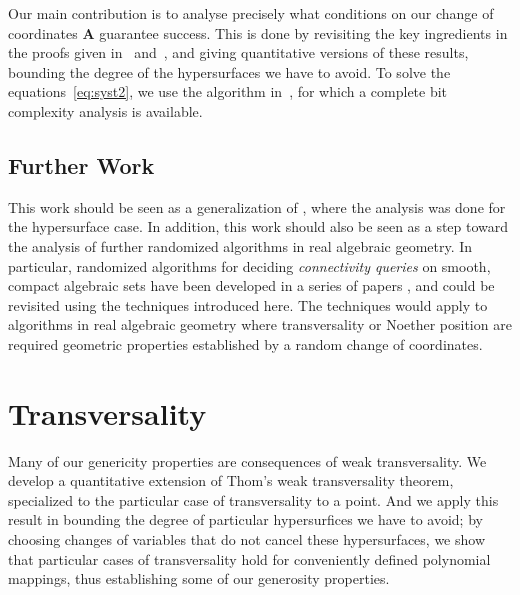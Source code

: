 \documentclass[a4paper]{article}
\def\mA{{\bm A}}
\begin{document}
Our main contribution is to analyse precisely what conditions on our
change of coordinates $\mA$ guarantee success. This is done by
revisiting the key ingredients in the proofs given
in~\cite{BaGiHeMb97} and~\cite{EMP}, and giving quantitative versions
of these results, bounding the degree of the hypersurfaces we have to
avoid.  To solve the equations~\eqref{eq:syst2}, we use the algorithm
in~\cite{SH}, for which a complete bit complexity analysis is
available.


\subsection{Further Work}
This work should be seen as a generalization of \cite{ElGiSh20}, where the analysis was done for the hypersurface case. In addition, this work should also be seen as a step toward the analysis of
further randomized algorithms in real algebraic geometry.  In particular, randomized algorithms for deciding {\em
  connectivity queries} on smooth, compact algebraic sets have been
developed in a series of papers
\cite{SchostMohabBabySteps2011,SchostMohabBabySteps2014}, and could be
revisited using the techniques introduced here. The techniques would apply to algorithms in real algebraic geometry where transversality or Noether position are required geometric properties established by a random change of coordinates.



\section{Transversality}
Many of our genericity properties are consequences of weak transversality. We develop a quantitative extension of Thom’s weak transversality theorem, specialized to the particular case of transversality to a point. And we apply this result in bounding the degree of particular hypersurfices we have to avoid; by choosing changes of variables that do not cancel these hypersurfaces, we show that particular cases of transversality hold for conveniently defined polynomial mappings, thus establishing some of our generosity properties.  
\end{document}
